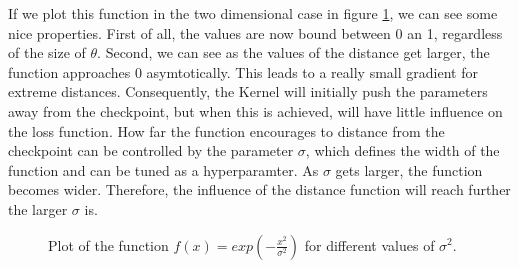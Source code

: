 If we plot this function in the two dimensional case in figure
\ref{fig:Gaussian}, we can see some nice properties. First of all, the values
are now bound between 0 an 1, regardless of the size of $\theta$. Second, we can
see as the values of the distance get larger, the function approaches 0
asymtotically. This leads to a really small gradient for extreme distances.
Consequently, the Kernel will initially push the parameters away from the
checkpoint, but when this is achieved, will have little influence on the loss
function. How far the function encourages to distance from the checkpoint can be
controlled by the parameter $\sigma$, which defines the width of the function
and can be tuned as a hyperparamter. As $\sigma$ gets larger, the function
becomes wider. Therefore, the influence of the distance function will reach
further the larger $\sigma$ is.

\begin{figure}[h]\label{fig:Gaussian}
    \centering
    \begin{center}
         \caption{Plot of the function $f(x)=exp(-\frac{x^2}{\sigma^2})$ for different values of $\sigma^2$.}
    \end{center}
\end{figure}


